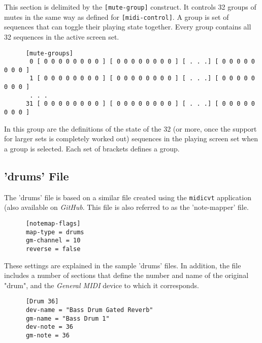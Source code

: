    This section is delimited by the \texttt{[mute-group]} construct.
   It controls 32 groups of mutes in the same way as defined for
   \texttt{[midi-control]}. A group is set of sequences that can toggle their
   playing state together.  Every group contains all 32 sequences in the
   active screen set.

   \begin{verbatim}
      [mute-groups]
       0 [ 0 0 0 0 0 0 0 0 ] [ 0 0 0 0 0 0 0 0 ] [ . . .] [ 0 0 0 0 0 0 0 0 ]
       1 [ 0 0 0 0 0 0 0 0 ] [ 0 0 0 0 0 0 0 0 ] [ . . .] [ 0 0 0 0 0 0 0 0 ]
       . . .
      31 [ 0 0 0 0 0 0 0 0 ] [ 0 0 0 0 0 0 0 0 ] [ . . .] [ 0 0 0 0 0 0 0 0 ]
   \end{verbatim}

   In this group are the definitions of the state of the 32 (or more, once the
   support for larger sets is completely worked out) sequences
   in the playing screen set when a group is selected.
   Each set of brackets defines a group.
%

\subsection{'drums' File}
\label{subsec:configuration_drums}

   The 'drums' file is based on a similar file created using the
   \texttt{midicvt} application (also available on \textsl{GitHub}.  This file
   is also referred to as the 'note-mapper' file.

   \begin{verbatim}
      [notemap-flags]
      map-type = drums
      gm-channel = 10
      reverse = false
   \end{verbatim}

   These settings are explained in the sample 'drums' files.  In addition, the
   file includes a number of sections that define the number and name of the
   original "drum", and the \textsl{General MIDI} device to which it
   corresponds.

   \begin{verbatim}
      [Drum 36]
      dev-name = "Bass Drum Gated Reverb"
      gm-name = "Bass Drum 1"
      dev-note = 36
      gm-note = 36
   \end{verbatim}

